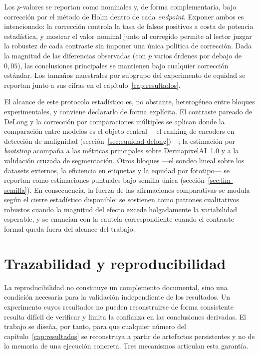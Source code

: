 Los $p$-valores se reportan como nominales y, de forma
complementaria, bajo corrección por el método de Holm dentro de cada
\emph{endpoint}. Exponer ambos es intencionado: la corrección controla
la tasa de falsos positivos a costa de potencia estadística, y
mostrar el valor nominal junto al corregido permite al lector juzgar
la robustez de cada contraste sin imponer una única política de
corrección. Dada la magnitud de las diferencias observadas (con $p$
varios órdenes por debajo de $0{,}05$), las conclusiones principales
se mantienen bajo cualquier corrección estándar. Los tamaños
muestrales por subgrupo del experimento de equidad se reportan junto
a sus cifras en el capítulo~\ref{cap:resultados}.

El alcance de este protocolo estadístico es, no obstante, heterogéneo
entre bloques experimentales, y conviene declararlo de forma
explícita. El contraste pareado de DeLong y la corrección por
comparaciones múltiples se aplican donde la comparación entre modelos
es el objeto central ---el ranking de encoders en detección de
malignidad (sección~\ref{sec:equidad-delong})---; la estimación por
\emph{bootstrap} acompaña a las métricas principales sobre
DermapixelAI~1.0 y a la validación cruzada de segmentación. Otros
bloques ---el sondeo lineal sobre los datasets externos, la eficiencia
en etiquetas y la equidad por fototipo--- se reportan como
estimaciones puntuales bajo semilla única
(sección~\ref{sec:lim-semilla}). En consecuencia, la fuerza de las
afirmaciones comparativas se modula según el cierre estadístico
disponible: se sostienen como patrones cualitativos robustos cuando la
magnitud del efecto excede holgadamente la variabilidad esperable, y
se enuncian con la cautela correspondiente cuando el contraste formal
queda fuera del alcance del trabajo.

\section{Trazabilidad y reproducibilidad}
\label{sec:reproducibilidad}

La reproducibilidad no constituye un complemento documental, sino
una condición necesaria para la validación independiente de los
resultados. Un experimento cuyos resultados no pueden reconstruirse
de forma consistente resulta difícil de verificar y limita la
confianza en las conclusiones derivadas. El trabajo se diseña, por
tanto, para que cualquier número del capítulo~\ref{cap:resultados}
se reconstruya a partir de artefactos persistentes y no de la
memoria de una ejecución concreta. Tres mecanismos articulan esta
garantía.

